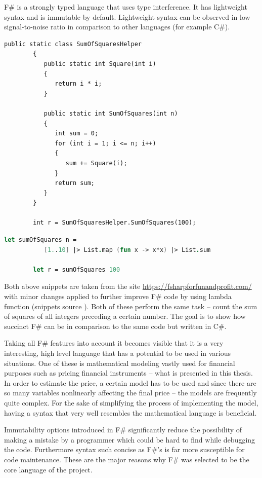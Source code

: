     F\# is a strongly typed language that uses type interference. It has lightweight syntax and is immutable by default. Lightweight syntax can be observed in low signal-to-noise ratio in comparison to other languages (for example C\#).
    
    \begin{lstlisting}[caption=C\# code example]
        public static class SumOfSquaresHelper
        {
           public static int Square(int i)
           {
              return i * i;
           }
    
           public static int SumOfSquares(int n)
           {
              int sum = 0;
              for (int i = 1; i <= n; i++)
              {
                 sum += Square(i);
              }
              return sum;
           }
        }
        
        int r = SumOfSquaresHelper.SumOfSquares(100);
    \end{lstlisting}
    
    \begin{lstlisting}[language=FSharp, caption=F\# code example]
        let sumOfSquares n = 
           [1..10] |> List.map (fun x -> x*x) |> List.sum
        
        let r = sumOfSquares 100
    \end{lstlisting}
    
    Both above snippets are taken from the site \url{https://fsharpforfunandprofit.com/} with minor changes applied to further improve F\# code by using lambda function (snippets source \cite{compareCandF}). Both of these perform the same task -- count the sum of squares of all integers preceding a certain number. The goal is to show how succinct F\# can be in comparison to the same code but written in C\#.
    
    Taking all F\# features into account it becomes visible that it is a very interesting, high level language that has a potential to be used in various situations. One of these is mathematical modeling vastly used for financial purposes such as pricing financial instruments -- what is presented in this thesis. In order to estimate the price, a certain model has to be used and since there are so many variables nonlinearly affecting the final price -- the models are frequently quite complex. For the sake of simplifying the process of implementing the model, having a syntax that very well resembles the mathematical language is beneficial.
    
    Immutability options introduced in F\# significantly reduce the possibility of making a mistake by a programmer which could be hard to find while debugging the code. Furthermore syntax such concise as F\#'s is far more susceptible for code maintenance.
    These are the major reasons why F\# was selected to be the core language of the project.
